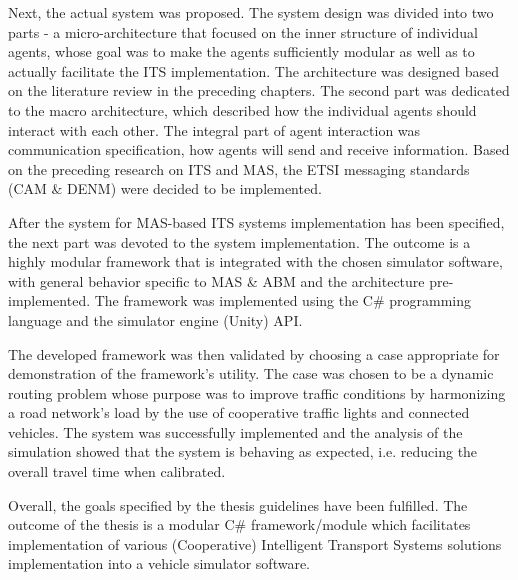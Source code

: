 \documentclass[titlepage, 12pt]{article}
\begin{document}
Next, the actual system was proposed. The system design was divided into two parts - a
micro-architecture that focused on the inner structure of individual agents, whose goal was to
make the agents sufficiently modular as well as to actually facilitate the ITS implementation.
The architecture was designed based on the literature review in the preceding chapters. The
second part was dedicated to the macro architecture, which described how the individual agents
should interact with each other. The integral part of agent interaction was communication
specification, how agents will send and receive information.  Based on the preceding research
on ITS and MAS, the ETSI messaging standards (CAM \& DENM) were decided to be implemented.

After the system for MAS-based ITS systems implementation has been specified, the next part was
devoted to the system implementation.  The outcome is a highly modular framework that is
integrated with the chosen simulator software, with general behavior specific to MAS \& ABM 
and the architecture pre-implemented. The framework was implemented using the C\# programming 
language and the simulator engine (Unity) API. 

The developed framework was then validated by choosing a case appropriate for demonstration of the 
framework's utility. The case was chosen to be a dynamic routing problem whose purpose was to 
improve traffic conditions by harmonizing a road network's load by the use of cooperative 
traffic lights and connected vehicles. The system was successfully implemented and the analysis of the 
simulation showed that the system is behaving as expected, i.e. reducing the overall travel time when 
calibrated.

Overall, the goals specified by the thesis guidelines have been fulfilled. The outcome of the thesis is a 
modular C\# framework/module which facilitates implementation of various (Cooperative) 
Intelligent Transport Systems solutions implementation into a vehicle simulator software. 

\clearpage

\thispagestyle{empty}
\listoftables
\listoffigures
\clearpage

\printbibliography
\end{document}
